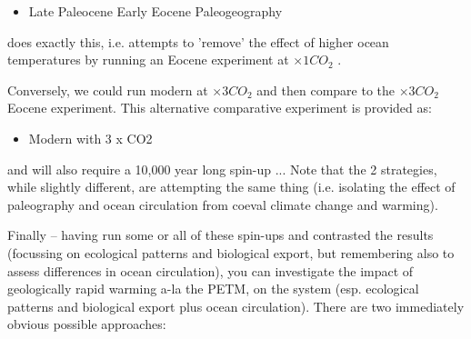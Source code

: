 \vspace{1mm}
\begin{itemize}[noitemsep]
\item[(2)] \textsf{\footnotesize Late Paleocene Early Eocene Paleogeography}
\end{itemize}
\vspace{1mm}

\noindent does exactly this, i.e. attempts to 'remove' the effect of higher ocean temperatures by running an Eocene experiment at \(\times1 CO_{2}\) .

Conversely, we could run modern at \(\times3 CO_{2}\) and then compare to the \(\times3 CO_{2}\) Eocene experiment. This alternative comparative experiment is provided as:

\vspace{1mm}
\begin{itemize}[noitemsep]
\item[(S1)] \textsf{\footnotesize Modern with 3 x CO2}
\end{itemize}
\vspace{1mm}

\noindent and will also require a 10,000 year long spin-up ... Note that the 2 strategies, while slightly different, are attempting the same thing (i.e. isolating the effect of paleography and ocean circulation from coeval climate change and warming).

\vspace{1mm}
Finally -- having run some or all of these spin-ups and contrasted the results (focussing on ecological patterns and biological export, but remembering also to assess differences in ocean circulation), you can investigate the impact of geologically rapid warming a-la the PETM, on the system (esp. ecological patterns and biological export plus ocean circulation). There are two immediately obvious possible approaches:

